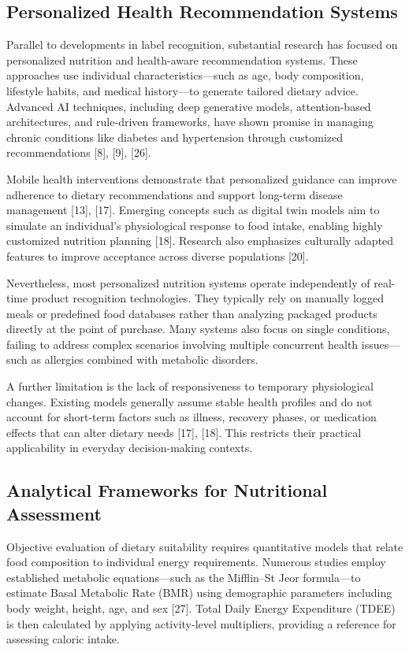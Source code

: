 \documentclass[conference]{IEEEtran}
\begin{document}
\subsection{Personalized Health Recommendation Systems}

Parallel to developments in label recognition, substantial research has focused on personalized nutrition and health-aware recommendation systems. These approaches use individual characteristics—such as age, body composition, lifestyle habits, and medical history—to generate tailored dietary advice. Advanced AI techniques, including deep generative models, attention-based architectures, and rule-driven frameworks, have shown promise in managing chronic conditions like diabetes and hypertension through customized recommendations [8], [9], [26].

Mobile health interventions demonstrate that personalized guidance can improve adherence to dietary recommendations and support long-term disease management [13], [17]. Emerging concepts such as digital twin models aim to simulate an individual’s physiological response to food intake, enabling highly customized nutrition planning [18]. Research also emphasizes culturally adapted features to improve acceptance across diverse populations [20].

Nevertheless, most personalized nutrition systems operate independently of real-time product recognition technologies. They typically rely on manually logged meals or predefined food databases rather than analyzing packaged products directly at the point of purchase. Many systems also focus on single conditions, failing to address complex scenarios involving multiple concurrent health issues—such as allergies combined with metabolic disorders.

A further limitation is the lack of responsiveness to temporary physiological changes. Existing models generally assume stable health profiles and do not account for short-term factors such as illness, recovery phases, or medication effects that can alter dietary needs [17], [18]. This restricts their practical applicability in everyday decision-making contexts.

\subsection{Analytical Frameworks for Nutritional Assessment}

Objective evaluation of dietary suitability requires quantitative models that relate food composition to individual energy requirements. Numerous studies employ established metabolic equations—such as the Mifflin–St Jeor formula—to estimate Basal Metabolic Rate (BMR) using demographic parameters including body weight, height, age, and sex [27]. Total Daily Energy Expenditure (TDEE) is then calculated by applying activity-level multipliers, providing a reference for assessing caloric intake.
\end{document}
